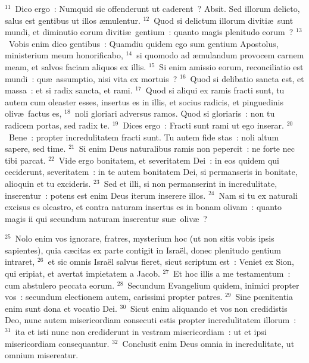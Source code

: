 ${}^{11}$~Dico ergo~: Numquid sic offenderunt ut caderent~? Absit. Sed illorum delicto, salus est gentibus ut illos \ae mulentur.
${}^{12}$~Quod si delictum illorum diviti\ae\ sunt mundi, et diminutio eorum diviti\ae\ gentium~: quanto magis plenitudo eorum~?
${}^{13}$~Vobis enim dico gentibus~: Quamdiu quidem ego sum gentium Apostolus, ministerium meum honorificabo,
${}^{14}$~si quomodo ad \ae mulandum provocem carnem meam, et salvos faciam aliquos ex illis.
${}^{15}$~Si enim amissio eorum, reconciliatio est mundi~: qu\ae\ assumptio, nisi vita ex mortuis~?
${}^{16}$~Quod si delibatio sancta est, et massa~: et si radix sancta, et rami.
${}^{17}$~Quod si aliqui ex ramis fracti sunt, tu autem cum oleaster esses, insertus es in illis, et socius radicis, et pinguedinis oliv\ae\ factus es,
${}^{18}$~noli gloriari adversus ramos. Quod si gloriaris~: non tu radicem portas, sed radix te.
${}^{19}$~Dices ergo~: Fracti sunt rami ut ego inserar.
${}^{20}$~Bene~: propter incredulitatem fracti sunt. Tu autem fide stas~: noli altum sapere, sed time.
${}^{21}$~Si enim Deus naturalibus ramis non pepercit~: ne forte nec tibi parcat.
${}^{22}$~Vide ergo bonitatem, et severitatem Dei~: in eos quidem qui ceciderunt, severitatem~: in te autem bonitatem Dei, si permanseris in bonitate, alioquin et tu excideris.
${}^{23}$~Sed et illi, si non permanserint in incredulitate, inserentur~: potens est enim Deus iterum inserere illos.
${}^{24}$~Nam si tu ex naturali excisus es oleastro, et contra naturam insertus es in bonam olivam~: quanto magis ii qui secundum naturam inserentur su\ae\ oliv\ae~?


${}^{25}$~Nolo enim vos ignorare, fratres, mysterium hoc (ut non sitis vobis ipsis sapientes), quia c\ae citas ex parte contigit in Isra\"el, donec plenitudo gentium intraret,
${}^{26}$~et sic omnis Isra\"el salvus fieret, sicut scriptum est~: Veniet ex Sion, qui eripiat, et avertat impietatem a Jacob.
${}^{27}$~Et hoc illis a me testamentum~: cum abstulero peccata eorum.
${}^{28}$~Secundum Evangelium quidem, inimici propter vos~: secundum electionem autem, carissimi propter patres.
${}^{29}$~Sine pœnitentia enim sunt dona et vocatio Dei.
${}^{30}$~Sicut enim aliquando et vos non credidistis Deo, nunc autem misericordiam consecuti estis propter incredulitatem illorum~:
${}^{31}$~ita et isti nunc non crediderunt in vestram misericordiam~: ut et ipsi misericordiam consequantur.
${}^{32}$~Conclusit enim Deus omnia in incredulitate, ut omnium misereatur.


